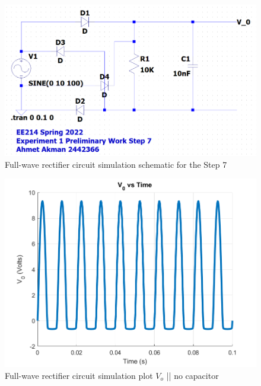 \documentclass[letterpaper,12pt]{article}
\begin{document}
\begin{figure}[H]
    \centering
   \includegraphics[width=1\textwidth]{7SCH.png}
   \caption{Full-wave rectifier circuit simulation schematic for the Step 7}
\end{figure} 

\begin{figure}[H]
    \centering
   \includegraphics[width=1\textwidth]{7_empty.png}
   \caption{Full-wave rectifier circuit simulation plot \(V_o\) || no capacitor }
\end{figure} 
\end{document}
